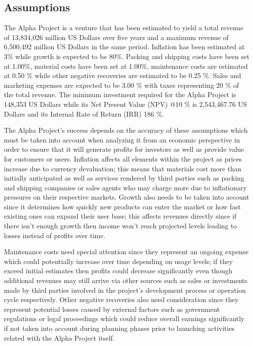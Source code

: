 

\subsection{Assumptions}\label{sec:assumptions}
The Alpha Project is a venture that has been estimated to yield a total revenue of 13,834,026 million US Dollars over five years and a maximum revenue of 6,500,492 million US Dollars in the same period. Inflation has been estimated at 3\% while growth is expected to be 80\%. Packing and shipping costs have been set at 1.00\%, material costs have been set at 1.00\%, maintenance costs are estimated at 0.50 \% while other negative recoveries are estimated to be 0.25 \%. Sales and marketing expenses are expected to be 3.00 \% with taxes representing 20 \% of the total revenue. The minimum investment required for the Alpha Project is 148,353 US Dollars while its Net Present Value (NPV) @10 \% is 2,543,467.76 US Dollars and its Internal Rate of Return (IRR) 186 \%. 

The Alpha Project's success depends on the accuracy of these assumptions which must be taken into account when analyzing it from an economic perspective in order to ensure that it will generate profits for investors as well as provide value for customers or users. Inflation affects all elements within the project as prices increase due to currency devaluation; this means that materials cost more than initially anticipated as well as services rendered by third parties such as packing and shipping companies or sales agents who may charge more due to inflationary pressures on their respective markets. Growth also needs to be taken into account since it determines how quickly new products can enter the market or how fast existing ones can expand their user base; this affects revenues directly since if there isn't enough growth then income won't reach projected levels leading to losses instead of profits over time. 

Maintenance costs need special attention since they represent an ongoing expense which could potentially increase over time depending on usage levels; if they exceed initial estimates then profits could decrease significantly even though additional revenues may still arrive via other sources such as sales or investments made by third parties involved in the project's development process or operation cycle respectively. Other negative recoveries also need consideration since they represent potential losses caused by external factors such as government regulations or legal proceedings which could reduce overall earnings significantly if not taken into account during planning phases prior to launching activities related with the Alpha Project itself. 

